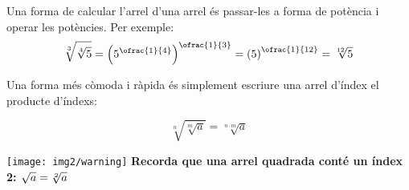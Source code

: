 \pagebreak

 \begin{theorybox}
 	Una forma de calcular l'arrel d'una arrel és passar-les a forma de potència i operar les potències. Per exemple:
 	\[ \sqrt[3]{ \sqrt[4]{5} } = \left(5^\ofrac{1}{4}\right)^\ofrac{1}{3} =  \left(5 \right)^\ofrac{1}{12} = \sqrt[12]{5}  \]
 	
 	Una forma més còmoda i ràpida és simplement escriure una arrel d'índex el producte d'índexs:
 	
 	\[ \sqrt[n]{ \sqrt[m]{a} } =  \sqrt[n\cdot m ]{a}  \]
 	
 	
 	\texttt{[image: img2/warning]}  \textbf{Recorda que una arrel quadrada conté un índex 2:  $\sqrt{a}=\sqrt[ {\small 2}]{a}$}
 \end{theorybox}



